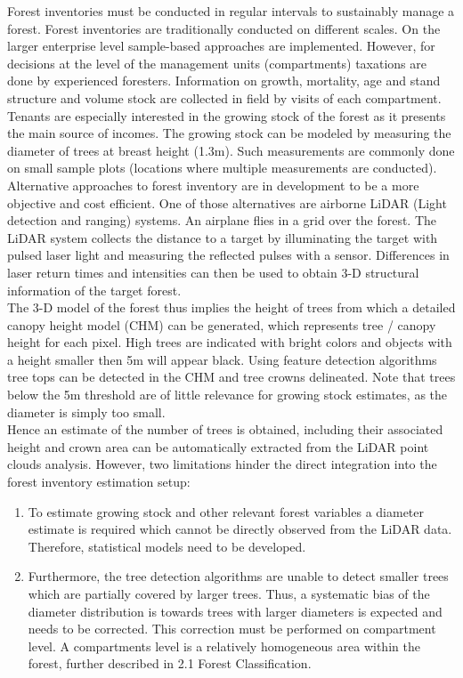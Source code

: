 
Forest inventories must be conducted in regular intervals to sustainably manage a forest. Forest inventories are
traditionally conducted on different scales. On the larger enterprise level sample-based approaches are
implemented. However, for decisions at the level of the management units (compartments) taxations are done
by experienced foresters. Information on growth, mortality, age and stand structure and volume stock are
collected in field by visits of each compartment. Tenants are especially interested in the growing stock of the
forest as it presents the main source of incomes. The growing stock can be modeled by measuring the diameter
of trees at breast height (1.3m). Such measurements are commonly done on small sample plots (locations
where multiple measurements are conducted).\\

Alternative approaches to forest inventory are in development to be a more objective and cost efficient. One of
those alternatives are airborne LiDAR (Light detection and ranging) systems. An airplane flies in a grid over the
forest. The LiDAR system collects the distance to a target by illuminating the target with pulsed laser light and
measuring the reflected pulses with a sensor. Differences in laser return times and intensities can then be used
to obtain 3-D structural information of the target forest.\\

The 3-D model of the forest thus implies the height of trees from which a detailed canopy height model (CHM)
can be generated, which represents tree / canopy height for each pixel. High trees are indicated with bright
colors and objects with a height smaller then 5m will appear black. Using feature detection algorithms tree tops
can be detected in the CHM and tree crowns delineated. Note that trees below the 5m threshold are of little
relevance for growing stock estimates, as the diameter is simply too small.\\

Hence an estimate of the number of trees is obtained, including their associated height and crown area can be automatically extracted from the LiDAR point clouds analysis. However, two limitations hinder the direct
integration into the forest inventory estimation setup:

\renewcommand{\labelenumi}{\arabic{enumi}.}
\begin{enumerate}
\item To estimate growing stock and other relevant forest variables a diameter estimate is required which
cannot be directly observed from the LiDAR data. Therefore, statistical models need to be developed.
\item Furthermore, the tree detection algorithms are unable to detect smaller trees which are partially
covered by larger trees. Thus, a systematic bias of the diameter distribution is towards trees with larger
diameters is expected and needs to be corrected.
This correction must be performed on compartment level. A compartments level is a relatively homogeneous area within the forest, further described in 2.1 Forest Classification.
\end{enumerate}

